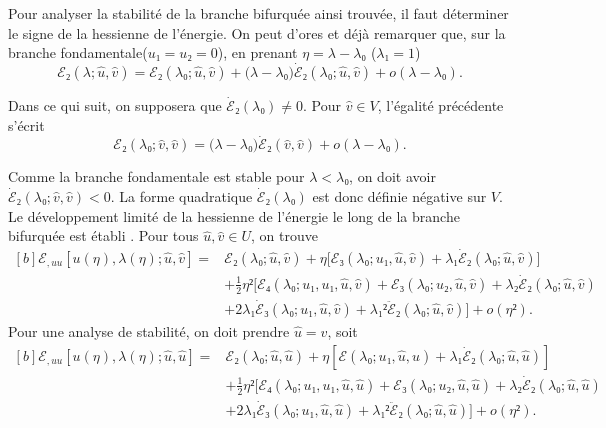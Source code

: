 \documentclass[12pt, final]{scrartcl}
\theoremstyle{definition}
\begin{document}
Pour analyser la stabilité de la branche bifurquée ainsi trouvée, il faut
déterminer le signe de la hessienne de l'énergie. On peut d'ores et déjà
remarquer que, sur la branche fondamentale(\(u₁ = u₂ = 0\)), en prenant
\(η = λ - λ₀\) (\(λ₁ = 1\))
\begin{equation}
 ℰ₂(λ; \hat{u}, \hat{v}) = ℰ₂(λ₀; \hat{u}, \hat{v}) + \bigl(λ - λ₀\bigr) \dot{ℰ}₂(λ₀; \hat{u}, \hat{v}) + o(λ - λ₀).
\end{equation}

Dans ce qui suit, on supposera que \(\dot{ℰ}₂(λ₀) ≠ 0\). Pour \(\hat{v}∈V\),
l'égalité précédente s'écrit
\begin{equation}
 ℰ₂(λ₀; \hat{v}, \hat{v}) = \bigl(λ - λ₀\bigr)\dot{ℰ}₂(\hat{v}, \hat{v}) + o(λ - λ₀).
\end{equation}

Comme la branche fondamentale est stable pour \(λ < λ₀\), on doit avoir
\(\dot{ℰ}₂(λ₀ ; \hat{v}, \hat{v}) < 0\). La forme quadratique \(\dot{ℰ}₂(λ₀)\)
est donc définie négative sur \(V\). Le développement limité de la hessienne de
l'énergie le long de la branche bifurquée est établi . Pour tous \(\hat{u}, \hat{v}∈U\), on trouve
\begin{equation}
  \label{eq:20220531054247}
  \begin{aligned}[b]
    ℰ_{, uu}[u(η), λ(η); \hat{u}, \hat{v}] ={}
    & ℰ₂(λ₀ ; \hat{u}, \hat{v}) + η \bigl[ℰ₃(λ₀ ; u₁, \hat{u}, \hat{v})  + λ₁ \dot{ℰ}₂(λ₀; \hat{u}, \hat{v})\bigr]\\
    & + \tfrac{1}{2} η² \bigl[ℰ₄(λ₀; u₁, u₁, \hat{u}, \hat{v}) + ℰ₃(λ₀; u₂, \hat{u}, \hat{v}) + λ₂ \dot{ℰ}₂(λ₀; \hat{u}, \hat{v})\\
    & + 2 λ₁ \dot{ℰ}₃(λ₀; u₁, \hat{u}, \hat{v}) + λ₁² \ddot{ℰ}₂(λ₀; \hat{u}, \hat{v}) \bigr] + o(η²).
  \end{aligned}
\end{equation}
Pour une analyse de stabilité, on doit prendre \(\hat{u} = \hat{v}\), soit
\begin{equation}
  \begin{aligned}[b]
    \label{eq:20220531054218}
    ℰ_{, uu}[u(η), λ(η) ; \hat{u}, \hat{u}] ={}
    & ℰ₂(λ₀; \hat{u}, \hat{u}) + η [ℰ(λ₀; u₁, \hat{u}, \hat{u}) + λ₁ \dot{ℰ}₂ (λ₀; \hat{u}, \hat{u})]\\
    & + \tfrac{1}{2} η² [ℰ₄(λ₀; u₁, u₁, \hat{u}, \hat{u}) +ℰ₃(λ₀; u₂, \hat{u}, \hat{u}) + λ₂ \dot{ℰ}₂(λ₀; \hat{u}, \hat{u})\\
    & + 2 λ₁ \dot{ℰ}₃(λ₀; u₁, \hat{u}, \hat{u}) + λ₁² \ddot{ℰ}₂(λ₀; \hat{u}, \hat{u})] + o(η²) .
  \end{aligned}
\end{equation}
\end{document}
